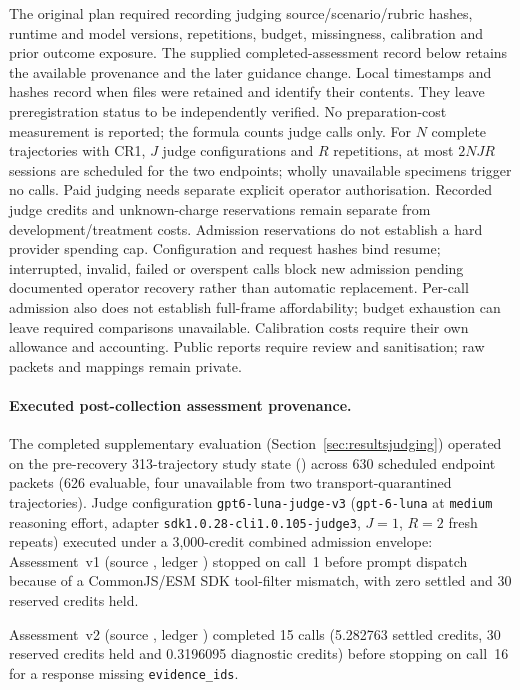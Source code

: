 The original plan required recording judging source/scenario/rubric hashes,
runtime and model versions, repetitions, budget, missingness, calibration
and prior outcome exposure. The supplied completed-assessment record below
retains the available provenance and the later guidance change.
Local timestamps and hashes record when files were retained and identify
their contents. They leave preregistration status to be independently verified.
No preparation-cost measurement is reported; the formula counts judge calls
only. For $N$ complete trajectories with CR1,
$J$ judge configurations and $R$ repetitions, at most $2NJR$ sessions
are scheduled for the two endpoints; wholly unavailable specimens trigger
no calls. Paid judging needs separate explicit operator authorisation.
Recorded judge credits and unknown-charge reservations remain separate
from development/treatment costs. Admission reservations do not establish
a hard provider spending cap. Configuration and request hashes bind
resume; interrupted, invalid, failed or overspent calls block new admission
pending documented operator recovery rather than automatic replacement.
Per-call admission also does not establish full-frame affordability;
budget exhaustion can leave required comparisons unavailable. Calibration
costs require their own allowance and accounting.
Public reports require review and sanitisation; raw packets and mappings
remain private.

\begingroup
\raggedright
\paragraph{Executed post-collection assessment provenance.}
The completed supplementary evaluation (Section~\ref{sec:resultsjudging})
operated on the pre-recovery 313-trajectory study state ()
across 630 scheduled endpoint packets (626 evaluable, four unavailable from
two transport-quarantined trajectories). Judge configuration
\nolinkurl{gpt6-luna-judge-v3} (\nolinkurl{gpt-6-luna} at \texttt{medium} reasoning
effort, adapter \nolinkurl{sdk1.0.28-cli1.0.105-judge3}, $J=1$, $R=2$ fresh
repeats) executed under a 3,000-credit combined admission envelope:
Assessment~v1 (source , ledger )
stopped on call~1 before prompt dispatch because of a CommonJS/ESM SDK
tool-filter mismatch, with zero settled and 30 reserved credits held.

Assessment~v2 (source , ledger )
completed 15 calls (5.282763 settled credits, 30 reserved credits held and
0.3196095 diagnostic credits) before stopping on call~16 for a response
missing \nolinkurl{evidence_ids}.

